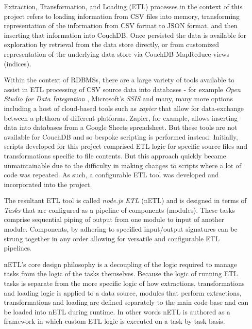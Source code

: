 Extraction, Transformation, and Loading (ETL) processes in the context of this project refers to loading information from CSV files into memory, transforming representation of the information from CSV format to JSON format, and then inserting that information into CouchDB. Once persisted the data is available for exploration by retrieval from the data store directly, or from customized representation of the underlying data store via CouchDB MapReduce views (indices).

Within the context of RDBMSs, there are a large variety of tools available to assist in ETL processing of CSV source data into databases - for example \textit{Open Studio for Data Integration} \cite{talend}, Microsoft's \textit{SSIS} \cite{ssis} and many, many more options including a host of cloud-based tools such as \textit{zapier} \cite{zapier} that allow for data-exchange between a plethora of different platforms. Zapier, for example, allows inserting data into databases from a Google Sheets spreadsheet. But these tools are not available for CouchDB and so bespoke scripting is performed instead. Initially, scripts developed for this project comprised ETL logic for specific source files and transformations specific to file contents. But this approach quickly became unmaintainable due to the difficulty in making changes to scripts where a lot of code was repeated. As such, a configurable ETL tool was developed and incorporated into the project.

The resultant ETL tool is called \textit{node.js ETL} (nETL) and is designed in terms of \textit{Tasks} that are configured as a pipeline of components (modules). These tasks comprise sequential piping of output from one module to input of another module. Components, by adhering to specified input/output signatures can be strung together in any order allowing for versatile and configurable ETL pipelines.

nETL's core design philosophy is a decoupling of the logic required to manage tasks from the logic of the tasks themselves. Because the logic of running ETL tasks is separate from the more specific logic of how extractions, transformations and loading logic is applied to a data source, modules that perform extractions, transformations and loading are defined separately to the main code base and can be loaded into nETL during runtime. In other words nETL is authored as a framework in which custom ETL logic is executed on a task-by-task basis.